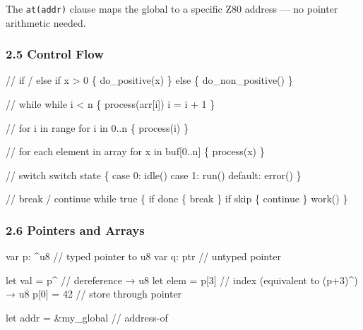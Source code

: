 \documentclass[
  11pt,
]{article}
\newenvironment{Shaded}{}{}
\newcommand{\NormalTok}[1]{#1}
\begin{document}
The \texttt{at(addr)} clause maps the global to a specific Z80 address
--- no pointer arithmetic needed.

\subsubsection{2.5 Control Flow}\label{control-flow}

\begin{Shaded}
\begin{Highlighting}[]
\NormalTok{// if / else}
\NormalTok{if x \textgreater{} 0 \{}
\NormalTok{    do\_positive(x)}
\NormalTok{\} else \{}
\NormalTok{    do\_non\_positive()}
\NormalTok{\}}

\NormalTok{// while}
\NormalTok{while i \textless{} n \{}
\NormalTok{    process(arr[i])}
\NormalTok{    i = i + 1}
\NormalTok{\}}

\NormalTok{// for i in range}
\NormalTok{for i in 0..n \{}
\NormalTok{    process(i)}
\NormalTok{\}}

\NormalTok{// for each element in array}
\NormalTok{for x in buf[0..n] \{}
\NormalTok{    process(x)}
\NormalTok{\}}

\NormalTok{// switch}
\NormalTok{switch state \{}
\NormalTok{    case 0: idle()}
\NormalTok{    case 1: run()}
\NormalTok{    default: error()}
\NormalTok{\}}

\NormalTok{// break / continue}
\NormalTok{while true \{}
\NormalTok{    if done \{ break \}}
\NormalTok{    if skip \{ continue \}}
\NormalTok{    work()}
\NormalTok{\}}
\end{Highlighting}
\end{Shaded}

\subsubsection{2.6 Pointers and Arrays}\label{pointers-and-arrays}

\begin{Shaded}
\begin{Highlighting}[]
\NormalTok{var p: \^{}u8              // typed pointer to u8}
\NormalTok{var q: ptr              // untyped pointer}

\NormalTok{let val = p\^{}            // dereference → u8}
\NormalTok{let elem = p[3]         // index (equivalent to (p+3)\^{}) → u8}
\NormalTok{p[0] = 42               // store through pointer}

\NormalTok{let addr = \&my\_global   // address{-}of}
\end{Highlighting}
\end{Shaded}
\end{document}
